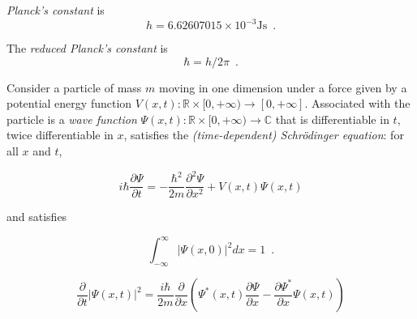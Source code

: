 \begin{df}
\emph{Planck's constant} is
\[ h = 6.62607015 \times 10^{-3} \mathrm{Js} \enspace . \]
\end{df}

\begin{df}
The \emph{reduced Planck's constant} is
\[ \hbar = h / 2 \pi \enspace . \]
\end{df}

Consider a particle of mass $m$ moving in one dimension under a force given by a potential energy function $V(x,t) : \mathbb{R} \times [0,+\infty) \rightarrow [0, + \infty]$. Associated with the particle is a \emph{wave function} $\Psi(x,t) : \mathbb{R} \times [0,+\infty) \rightarrow \mathbb{C}$ that is differentiable in $t$, twice differentiable in $x$, satisfies the \emph{(time-dependent) Schr\"{o}dinger equation}: for all $x$ and $t$,

\[ i \hbar \frac{\partial \Psi}{\partial t} = - \frac{\hbar^2}{2 m} \frac{\partial^2 \Psi}{\partial x^2} + V(x,t) \Psi(x,t) \]

and satisfies

\[ \int_{- \infty}^\infty |\Psi(x,0)|^2 dx = 1 \enspace . \]

\begin{prop}
\label{prop:differentiate_psi_squared}
\[ \frac{\partial}{\partial t} |\Psi(x,t)|^2 = \frac{i \hbar}{2m} \frac{\partial}{\partial x} \left(
\Psi^*(x,t) \frac{\partial \Psi}{\partial x} - \frac{\partial \Psi^*}{\partial x} \Psi(x,t) \right) \]
\end{prop}

